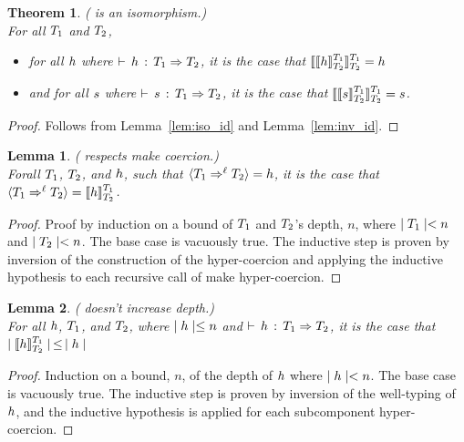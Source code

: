 \documentclass[acmtog, authorversion, acmlarge]{acmart}
\newtheorem{thm}{Theorem}
\newtheorem{lem}{Lemma}
\begin{document}
\begin{thm}
  \label{thm:iso}
  ( is an isomorphism.)\\
  For all $\T_1$ and $\T_2$,
  \begin{itemize}
    \item[]for all $\HC$ where $\cwt{\HC}{\T_1}{\T_2}$,
      it is the case that $\interp{\interp{h}{\T_1}{\T_2}}{\T_1}{\T_2} = \HC$
    \item[]and for all $\SE$ where $\cwt{\SE}{\T_1}{\T_2}$,
      it is the case that $\interp{\interp{\SE}{\T_1}{\T_2}}{\T_1}{\T_2} = \SE$.
  \end{itemize}
\end{thm}
\begin{proof}
  Follows from Lemma~\ref{lem:iso_id} and Lemma~\ref{lem:inv_id}. 
\end{proof}

\begin{lem}
  \label{lem:iso_mk}
  ( respects make coercion.)\\
  Forall $\T_1$, $\T_2$, and $\HC$, such that
  $\mkcrcn{\T_1}{\T_2} = \HC$, it is the case that
  $\mkcrcn{\T_1}{\T_2} = \interp{\HC}{\T_1}{\T_2}$.
\end{lem}
\begin{proof}
  Proof by induction on a bound of $\T_1$ and $\T_2$'s depth, $n$,
  where $\depth{\T_1} < n$ and $\depth{\T_2} < n$.
  The base case is vacuously true.
  The inductive step is proven by inversion of the construction
  of the hyper-coercion and applying the inductive hypothesis
  to each recursive call of make hyper-coercion. 
\end{proof}

\begin{lem}
  \label{lem:iso_bound}
  ( doesn't increase depth.)\\
  For all $\HC$, $\T_1$, and $\T_2$, where
  $\depth{\HC} \le n$ and
  $\cwt{\HC}{\T_1}{\T_2}$,
  it is the case that
  $\depth{\interp{\HC}{\T_1}{\T_2}} \, \le \, \depth{\HC}$
\end{lem}
\begin{proof}
  Induction on a bound, $n$, of the depth of $\HC$ where
  $\depth{\HC} < n$.
  The base case is vacuously true.
  The inductive step is proven by inversion of the well-typing
  of $\HC$, and the inductive hypothesis
  is applied for each subcomponent hyper-coercion. 
\end{proof}
\end{document}
